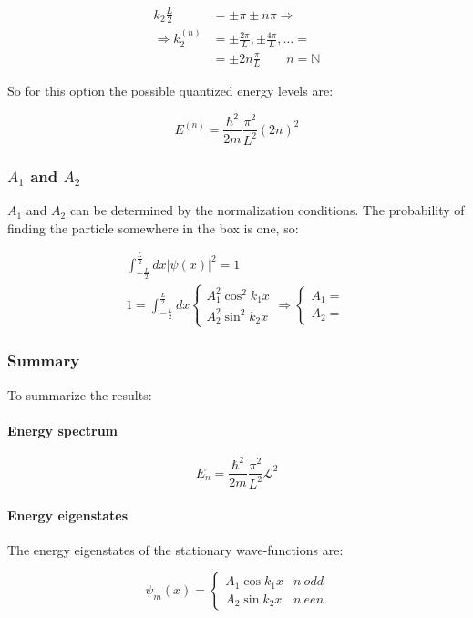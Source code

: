     \begin{align*}
      k_2 \frac{L}{2} &=\pm \pi\pm n\pi\Rightarrow\\
      \Rightarrow k_2^{(n)} &=\pm \frac{2\pi}{L},\pm \frac{4\pi}{L},\dots =\\
                            &= \pm 2n\frac{\pi}{L}\qquad n = \mathbb{N}
    \end{align*}

    So for this option the possible quantized energy levels are:

    $$E^{(n)} = \frac{\hbar^2}{2m}\frac{\pi^2}{L^2}(2n)^2$$

    \subsubsection{$A_1$ and $A_2$}
    $A_1$ and $A_2$ can be determined by the normalization conditions.
    The probability of finding the particle somewhere in the box is one, so:

    \begin{align*}
      \int_{-\frac{L}{2}}^{\frac{L}{2}} dx|\psi(x)|^2 = 1\\
      1 = \int_{-\frac{L}{2}}^{\frac{L}{2}} dx\begin{cases}A_1^2\cos^2k_1x\\A_2^2\sin^2 k_2x\end{cases}\Rightarrow\begin{cases}A_1 = \\A_2 = \end{cases}
    \end{align*}

    \subsubsection{Summary}
    To summarize the results:

      \paragraph{Energy spectrum}

      $$E_n = \frac{\hbar^2}{2m}\frac{\pi^2}{L^2}\mathcal{L}^2$$

      \paragraph{Energy eigenstates}
      The energy eigenstates of the stationary wave-functions are:

      $$\psi_m(x) = \begin{cases}A_1\cos k_1 x & n\ odd\\ A_2\sin k_2 x & n\ een\end{cases}$$


